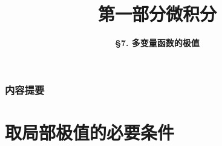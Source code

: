 




\title[Calculus]{\LARGE \bfseries 第一部分\quad 微积分} %
\author[Extrema of Multivariate Functions] %
{\Large \bfseries \S 7. 多变量函数的极值
}
\date{}



\begin{frame}
\titlepage %
\end{frame}

\begin{frame}
\frametitle{内容提要} %
\tableofcontents %
\end{frame}



\section{取局部极值的必要条件}


